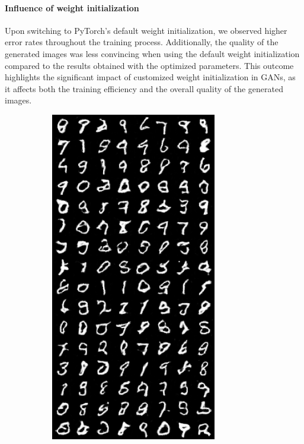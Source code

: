 \paragraph*{Influence of weight initialization}
Upon switching to PyTorch's default weight initialization, we observed higher error rates throughout the training process. Additionally, the quality of the generated images was less convincing when using the default weight initialization compared to the results obtained with the optimized parameters. This outcome highlights the significant impact of customized weight initialization in GANs, as it affects both the training efficiency and the overall quality of the generated images.

\begin{figure}[H]
    \centering

    \begin{subfigure}{0.2\textwidth}
        \centering
        \includegraphics[width=0.95\linewidth]{init/fake_sample_epoch_0005.png}

\end{subfigure}
\end{figure}
